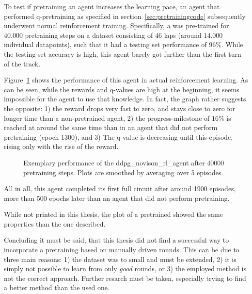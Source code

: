 To test if pretraining an agent increases the learning pace, an agent that performed q-pretraining as specified in section~\ref{sec:pretrainingcode} subsequently underwent normal reinforcement training. Specifically, a  was pre-trained for $40.000$ pretraining steps on a dataset consisting of $46$ laps (around $14.000$ individual datapoints), such that it had a testing set performance of $96\%$. While the testing set accuracy is high, this agent barely got further than the first turn of the track.

Figure~\ref{fig:ddpg_incorpPre} shows the performance of this agent in actual reinforcement learning. As can be seen, while the rewards and q-values are high at the beginning, it seems impossible for the agent to use that knowledge. In fact, the graph rather suggests the opposite: 1) the reward drops very fast to zero, and stays close to zero for longer time than a non-pretrained agent, 2) the progress-milestone of $16\%$ is reached at around the same time than in an agent that did not perform pretraining (epoch 1300), and 3) The q-value is decreasing until this episode, rising only with the rise of the reward.

\begin{figure}[h]
	{%
		\setlength{\fboxsep}{0pt}%
		\setlength{\fboxrule}{1pt}%
	}%
	\centering
	\caption[Exemplary performance of the ddpg\_novison\_rl\_agent after 40000 pretrain steps]{Exemplary performance of the ddpg\_novison\_rl\_agent after 40000 pretraining steps. Plots are smoothed by averaging over 5 episodes.}
	\label{fig:ddpg_incorpPre}
\end{figure}

All in all, this agent completed its first full circuit after around 1900 episodes, more than 500 epochs later than an agent that did not perform pretraining. 

While not printed in this thesis, the plot of a pretrained  showed the same properties than the one described.

Concluding it must be said, that this thesis did not find a successful way to incorporate a pretraining based on manually driven rounds. This can be due to three main reasons: 1) the dataset was to small and must be extended, 2) it is simply not possible to learn from only \textit{good} rounds, or 3) the employed method is not the correct approach. Further resarch must be taken, especially trying to find a better method than the used one.

